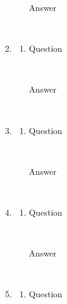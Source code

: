 \documentclass{article}
\begin{document}
\begin{enumerate}
\begin{enumerate}[label=(\alph*)]
\begin{description}
      \item[Answer] \hfill \\
      
    \end{description}
  \end{enumerate}
  
  \item
  \begin{enumerate}[label=(\alph*)]
    \item 
    \begin{description}
      \item[Question] \hfill \\

      \item[Answer] \hfill \\
      
    \end{description}
  \end{enumerate}
  
  \item
  \begin{enumerate}[label=(\alph*)]
    \item 
    \begin{description}
      \item[Question] \hfill \\

      \item[Answer] \hfill \\
      
    \end{description}
  \end{enumerate}
  
  \item
  \begin{enumerate}[label=(\alph*)]
    \item 
    \begin{description}
      \item[Question] \hfill \\

      \item[Answer] \hfill \\
      
    \end{description}
  \end{enumerate}
  
  \item
  \begin{enumerate}[label=(\alph*)]
    \item 
    \begin{description}
      \item[Question] \hfill \\


\end{description}
\end{enumerate}
\end{enumerate}
\end{document}
